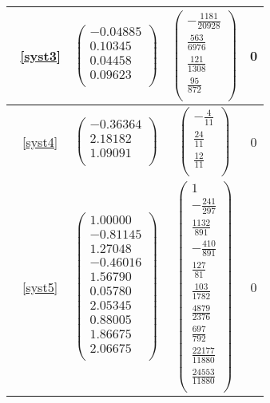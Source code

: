 \documentclass{report}
\begin{document}
\begin{tabular}{|c|c|c|c|}
	    \hline
           ~\eqref{syst3} 
           & $\begin{pmatrix}
				-0.04885	\\
				0.10345	\\
				0.04458	\\
				0.09623 \\
			     \end{pmatrix}$
           & $\begin{pmatrix}
				-\frac{1181}{20928} \\
				\frac{563}{6976} \\
				\frac{121}{1308} \\
				\frac{95}{872} \\
			     \end{pmatrix}$         
		   & 0 \\
	    \hline
           ~\eqref{syst4} 
           & $\begin{pmatrix}
				-0.36364	 \\
				2.18182	\\
				1.09091 \\
			     \end{pmatrix}$
           & $\begin{pmatrix}
				-\frac{4}{11} \\
				\frac{24}{11} \\
				\frac{12}{11} \\
			     \end{pmatrix}$          
		   & 0 \\
	    \hline
           ~\eqref{syst5} 
           & $\begin{pmatrix}
				1.00000	\\
				-0.81145	 \\
				1.27048	 \\
				-0.46016	 \\
				1.56790	 \\
				0.05780	\\
				2.05345	\\
				0.88005	\\
				1.86675	\\
				2.06675 \\
			     \end{pmatrix}$
           & $\begin{pmatrix}
				1 \\
				-\frac{241}{297} \\
				\frac{1132}{891} \\
				-\frac{410}{891} \\
				\frac{127}{81} \\
				\frac{103}{1782} \\
				\frac{4879}{2376} \\
				\frac{697}{792} \\
				\frac{22177}{11880} \\
				\frac{24553}{11880} \\
			     \end{pmatrix}$          
		  & 0 \\
	    \hline

         \end{tabular}
         \renewcommand{\arraystretch}{1}
        
\end{document}
